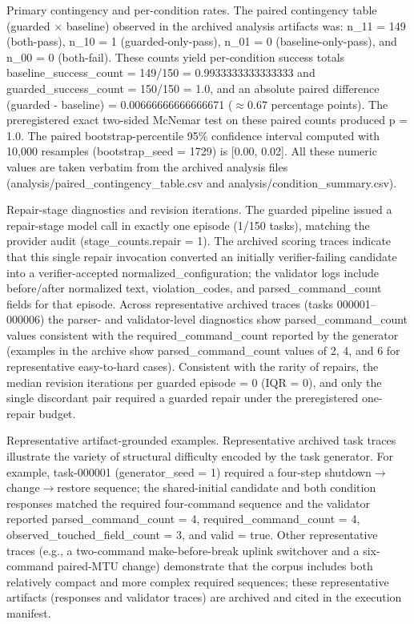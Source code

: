 \documentclass[conference]{IEEEtran}
\begin{document}
Primary contingency and per-condition rates. The paired contingency table (guarded \ensuremath{\times} baseline) observed in the archived analysis artifacts was: n\_11 = 149 (both-pass), n\_10 = 1 (guarded-only-pass), n\_01 = 0 (baseline-only-pass), and n\_00 = 0 (both-fail). These counts yield per-condition success totals baseline\_success\_count = 149/150 = 0.9933333333333333 and guarded\_success\_count = 150/150 = 1.0, and an absolute paired difference (guarded - baseline) = 0.00666666666666671 (\ensuremath{\approx}0.67 percentage points). The preregistered exact two-sided McNemar test on these paired counts produced p = 1.0. The paired bootstrap-percentile 95\% confidence interval computed with 10,000 resamples (bootstrap\_seed = 1729) is [0.00, 0.02]. All these numeric values are taken verbatim from the archived analysis files (analysis/paired\_contingency\_table.csv and analysis/condition\_summary.csv).

Repair-stage diagnostics and revision iterations. The guarded pipeline issued a repair-stage model call in exactly one episode (1/150 tasks), matching the provider audit (stage\_counts.repair = 1). The archived scoring traces indicate that this single repair invocation converted an initially verifier-failing candidate into a verifier-accepted normalized\_configuration; the validator logs include before/after normalized text, violation\_codes, and parsed\_command\_count fields for that episode. Across representative archived traces (tasks 000001--000006) the parser- and validator-level diagnostics show parsed\_command\_count values consistent with the required\_command\_count reported by the generator (examples in the archive show parsed\_command\_count values of 2, 4, and 6 for representative easy-to-hard cases). Consistent with the rarity of repairs, the median revision iterations per guarded episode = 0 (IQR = 0), and only the single discordant pair required a guarded repair under the preregistered one-repair budget.

Representative artifact-grounded examples. Representative archived task traces illustrate the variety of structural difficulty encoded by the task generator. For example, task-000001 (generator\_seed = 1) required a four-step shutdown\ensuremath{\rightarrow}change\ensuremath{\rightarrow}restore sequence; the shared-initial candidate and both condition responses matched the required four-command sequence and the validator reported parsed\_command\_count = 4, required\_command\_count = 4, observed\_touched\_field\_count = 3, and valid = true. Other representative traces (e.g., a two-command make-before-break uplink switchover and a six-command paired-MTU change) demonstrate that the corpus includes both relatively compact and more complex required sequences; these representative artifacts (responses and validator traces) are archived and cited in the execution manifest.
\end{document}
